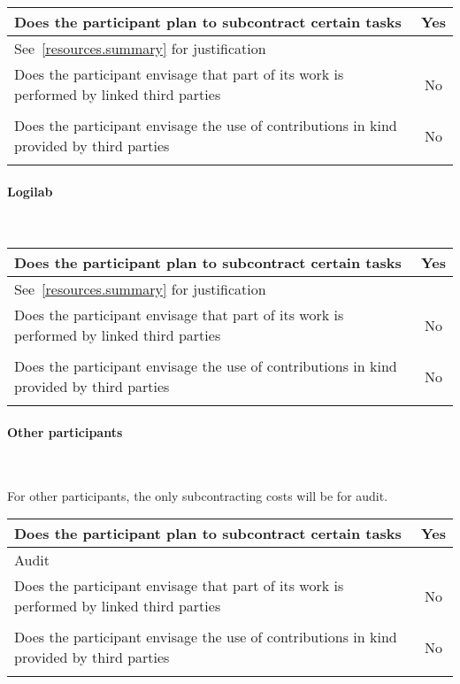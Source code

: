 \documentclass[noworkareas,deliverables,\classoptions]{euproposal}       %
\begin{document}
\begin{proposal}
\bgroup
\def\arraystretch{1.5}  %
\noindent \begin{tabular}{|p{}|c|}
\hline
Does the participant plan to subcontract certain
tasks & Yes \\
\hline
\multicolumn{2}{|l|}{See~\ref{resources.summary} for justification} \\
\hline
Does the participant envisage that part of its work
is performed by linked third parties & No \\
\hline
\multicolumn{2}{|l|}{} \\
\hline
Does the participant envisage the use of
contributions in kind provided by
third parties & No \\
\hline
\multicolumn{2}{|l|}{} \\
\hline
\end{tabular}
\egroup

\paragraph{Logilab}\ 

\bgroup
\def\arraystretch{1.5}  %
\noindent \begin{tabular}{|p{}|c|}
\hline
Does the participant plan to subcontract certain
tasks & Yes \\
\hline
\multicolumn{2}{|l|}{See~\ref{resources.summary} for justification} \\
\hline
Does the participant envisage that part of its work
is performed by linked third parties & No \\
\hline
\multicolumn{2}{|l|}{} \\
\hline
Does the participant envisage the use of
contributions in kind provided by
third parties & No \\
\hline
\multicolumn{2}{|l|}{} \\
\hline
\end{tabular}
\egroup

\paragraph{Other participants}\ 

For other participants, the only subcontracting costs will be for audit.

\bgroup
\def\arraystretch{1.5}  %
\noindent \begin{tabular}{|p{}|c|}
\hline
Does the participant plan to subcontract certain
tasks & Yes \\
\hline
\multicolumn{2}{|l|}{Audit} \\
\hline
Does the participant envisage that part of its work
is performed by linked third parties & No \\
\hline
\multicolumn{2}{|l|}{} \\
\hline
Does the participant envisage the use of
contributions in kind provided by
third parties & No \\
\hline
\multicolumn{2}{|l|}{} \\
\hline
\end{tabular}
\egroup




\end{proposal}
\end{document}
